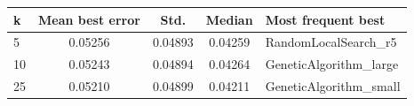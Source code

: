 \begin{tabular}{lcccl}
\toprule
k & Mean best error & Std. & Median & Most frequent best \\
\midrule
5 & 0.05256 & 0.04893 & 0.04259 & RandomLocalSearch\_r5 \\
10 & 0.05243 & 0.04894 & 0.04264 & GeneticAlgorithm\_large \\
25 & 0.05210 & 0.04899 & 0.04211 & GeneticAlgorithm\_small \\
\bottomrule
\end{tabular}
